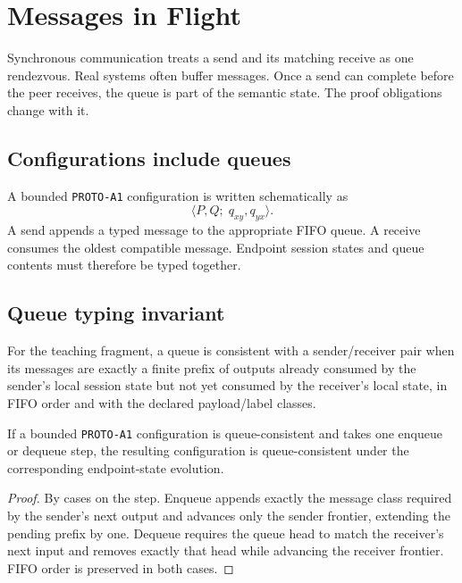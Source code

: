 \chapter{Messages in Flight}

Synchronous communication treats a send and its matching receive as one rendezvous. Real systems often buffer messages. Once a send can complete before the peer receives, the queue is part of the semantic state. The proof obligations change with it.

\section{Configurations include queues}
A bounded \texttt{PROTO-A1} configuration is written schematically as
\[
\langle P,Q;\;q_{xy},q_{yx}\rangle.
\]
A send appends a typed message to the appropriate FIFO queue. A receive consumes the oldest compatible message. Endpoint session states and queue contents must therefore be typed together.



\section{Queue typing invariant}
\begin{definition}
For the teaching fragment, a queue is consistent with a sender/receiver pair when its messages are exactly a finite prefix of outputs already consumed by the sender's local session state but not yet consumed by the receiver's local state, in FIFO order and with the declared payload/label classes.
\end{definition}
\begin{theorem}
If a bounded \texttt{PROTO-A1} configuration is queue-consistent and takes one enqueue or dequeue step, the resulting configuration is queue-consistent under the corresponding endpoint-state evolution.
\end{theorem}
\begin{proof}
By cases on the step. Enqueue appends exactly the message class required by the sender's next output and advances only the sender frontier, extending the pending prefix by one. Dequeue requires the queue head to match the receiver's next input and removes exactly that head while advancing the receiver frontier. FIFO order is preserved in both cases.
\end{proof}

